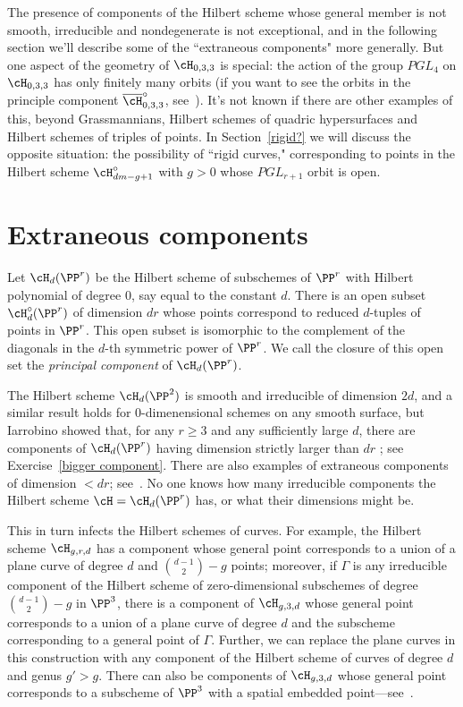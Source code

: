 The presence of components of the Hilbert scheme whose general member is not smooth, irreducible and nondegenerate is not exceptional, and in the following section we'll describe some of the ``extraneous components" more generally. But one aspect of the geometry of $\cH_{0,3,3}$ is special: the action of the group $PGL_4$ on $\cH_{0,3,3}$ has only finitely many orbits (if you want to see the orbits in the principle component $\overline{\cH}^\circ_{0,3,3}$, see~\cite{Montreal}). It's not known if there are other examples of this, beyond Grassmannians, Hilbert schemes of quadric hypersurfaces and Hilbert schemes of triples of points.  In Section~\ref{rigid?} we will discuss the opposite situation: the possibility of ``rigid curves,"  corresponding to points in the Hilbert scheme $\cH^{\circ}_{dm-g+1}$ with $g>0$ whose $PGL_{r+1}$ orbit is open.

\section{Extraneous components}

Let $\cH_d(\PP^r)$ be the Hilbert scheme of subschemes of $\PP^r$
with Hilbert polynomial of degree 0, say equal to the constant $d$.
There is an open subset $\cH^\circ_d(\PP^r)$ of dimension $dr$ whose
points correspond to reduced $d$-tuples of points in $\PP^r$. This
open subset is isomorphic to the complement of the diagonals in the
$d$-th symmetric power of $\PP^r$. We call the closure of this open
set the \emph{principal component} of $\cH_d(\PP^r)$.
 
The Hilbert scheme  $\cH_d(\PP^2)$ is smooth and irreducible of dimension $2d$, and a similar result holds for 
0-dimenensional schemes on any smooth surface, but Iarrobino showed that, for any $r \geq 3$ and any sufficiently large $d$, there are components of $\cH_d(\PP^r)$ having dimension strictly larger than $dr$ \cite{Iarrobino1985}; see Exercise~\ref{bigger component}. There are also examples of extraneous components
of dimension $<dr$; see~\cite{MR2579394}. No one knows how many irreducible components the Hilbert scheme $\cH = \cH_d(\PP^r)$ has, or what their dimensions might be.

This in turn infects the Hilbert schemes of curves. For example, the Hilbert scheme $\cH_{g,r,d}$ has a component whose general point corresponds to a union of a plane curve of degree $d$ and $\binom{d-1}{2} - g$ points; moreover, if $\Gamma$ is any irreducible component of the Hilbert scheme of zero-dimensional subschemes of degree $\binom{d-1}{2} - g$ in $\PP^3$, there is a component of $\cH_{g,3,d}$ whose  general point corresponds to a union of a plane curve of degree $d$ and the subscheme corresponding to a general point of $\Gamma$. Further, we can replace the plane curves in this construction with any component of the Hilbert scheme of curves of degree $d$ and genus $g' > g$. There can also be components of $\cH_{g,3,d}$ whose general point corresponds to a subscheme of $\PP^3$ with a spatial embedded point---see~\cite{Chen-Nollet}.


